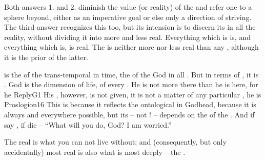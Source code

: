 Both answers 1. and 2. diminish the value (or reality) of the  and
refer one to a sphere beyond, either as an imperative goal or else only a
direction of striving. The third answer recognizes this  too,
but its intension is to discern its  in all the reality, without
dividing it into more and less real. Everything which is  is,
and everything which is, is real. The  is neither more
nor less real than any , although it is the prior
 of the latter. 

\pa
{} is the  of the trans-temporal in time, the 
 of the  God in all . But in terms of
, it is .
%
%
God is the  dimension of life, of every . He is not
more  there than he is here, for he \citet{exists as a whole at every time
  and in every place.}{ReplyG}{1} His , however, is not given, it
is not a matter of any particular , he is \citet{within me and
  around me and I do not have any experience of [him].}{Proslogion}{16} This
 is  because it reflects the ontological
 in Godhead, because it is always and everywhere possible, but
its  -- not ! -- depends on the  of
the . And if 
 say \No, if  die -- ``What will you do, God?  I am worried.''

\tsep{}

The real is what you can not live without; and (consequently, but only
accidentally) most real is also what
is most deeply  -- the . 

